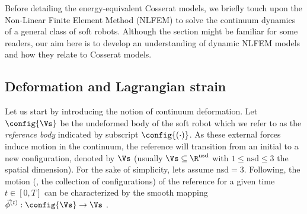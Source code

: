 Before detailing the energy-equivalent Cosserat models, we briefly touch upon the Non-Linear Finite Element Method (NLFEM) to solve the continuum dynamics of a general class of soft robots. Although the section might be familiar for some readers, our aim here is to develop an understanding of dynamic NLFEM models and how they relate to Cosserat models.

\subsection{Deformation and Lagrangian strain}
Let us start by introducing the notion of continuum deformation. Let $\config{\Vs}$ be the undeformed body of the soft robot which we refer to as the \textit{reference body} indicated by subscript $\config{(\cdot)}$. As these external forces induce motion in the continuum, the reference will transition from an initial to a new configuration, denoted by $\Vs$ (usually $\Vs \subseteq \R^{\text{nsd}}$ with $1 \le \text{nsd} \le 3$ the spatial dimension). For the sake of simplicity, lets assume $\text{nsd} = 3$. Following, the motion (\ie, the collection of configurations) of the reference for a given time $t \in [0,T]$ can be characterized by the smooth mapping $\vec{\phi}^{(t)}: \config{\Vs} \to \Vs$ \cite{Kim2018,Laursen2001}.


